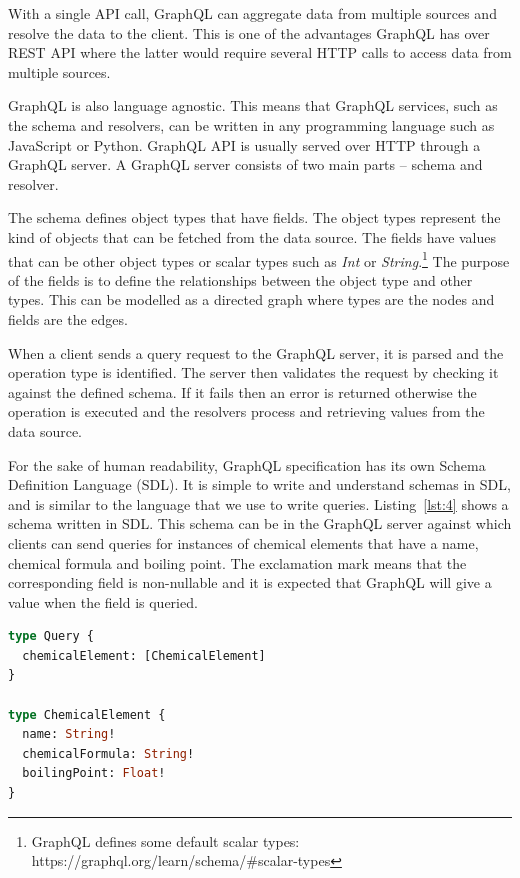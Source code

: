 With a single API call, GraphQL can aggregate data from multiple sources and resolve the data to the client. This is one of the advantages GraphQL has over REST API where the latter would require several HTTP calls to access data from multiple sources. 

GraphQL is also language agnostic. This means that GraphQL services, such as the schema and resolvers, can be written in any programming language such as JavaScript or Python. GraphQL API is usually served over HTTP through a GraphQL server. A GraphQL server consists of two main parts – schema and resolver. 

The schema defines object types that have fields. The object types represent the kind of objects that can be fetched from the data source. The fields have values that can be other object types or scalar types such as \textit{Int} or \textit{String}.\footnote{GraphQL defines some default scalar types: https://graphql.org/learn/schema/\#scalar-types} The purpose of the fields is to define the relationships between the object type and other types. This can be modelled as a directed graph where types are the nodes and fields are the edges. 

When a client sends a query request to the GraphQL server, it is parsed and the operation type is identified. The server then validates the request by checking it against the defined schema. If it fails then an error is returned otherwise the operation is executed and the resolvers process and retrieving values from the data source.

For the sake of human readability, GraphQL specification has its own Schema Definition Language (SDL). It is simple to write and understand schemas in SDL, and is similar to the language that we use to write queries. Listing~\ref{lst:4} shows a schema written in SDL. This schema can be in the GraphQL server against which clients can send queries for instances of chemical elements that have a name, chemical formula and boiling point. The exclamation mark means that the corresponding field is non-nullable and it is expected that GraphQL will give a value when the field is queried.

\begin{minipage}{\linewidth}
\begin{lstlisting}[label=lst:4, caption={A GraphQL Schema defined to query a chemical element}, language=GraphQL]
type Query {
  chemicalElement: [ChemicalElement]
}

type ChemicalElement {
  name: String!
  chemicalFormula: String!
  boilingPoint: Float!
}
\end{lstlisting}
\end{minipage}



